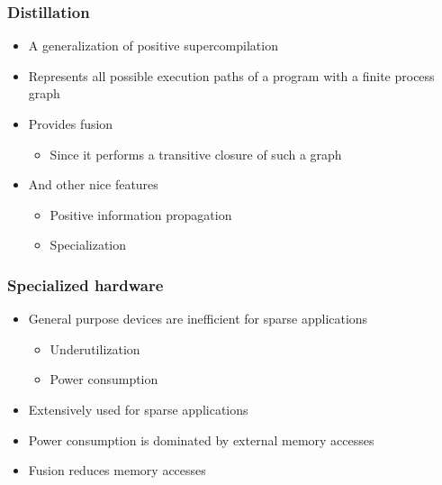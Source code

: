 \documentclass[xcolor=table]{beamer}
\begin{document}
\begin{frame}[fragile] \frametitle{Distillation}
    \begin{itemize}
        \item A generalization of positive supercompilation
        \vfill
        \item Represents all possible execution paths of a program with a finite process graph
        \vfill
        \item Provides \textcolor{forestgreen(web)}{fusion}
        \vfill
        \begin{itemize}
            \item Since it performs a transitive closure of such a graph
            \vfill
        \end{itemize}
        \item And other nice features
        \vfill
        \begin{itemize}
            \item Positive information propagation
            \vfill
            \item Specialization
        \end{itemize}
    \end{itemize}
  \end{frame}
  
  
\begin{frame}[fragile] \frametitle{Specialized hardware}
    \begin{itemize}
        \item General purpose devices are inefficient for sparse applications
        \vfill
        \begin{itemize}
            \item Underutilization
            \vfill
            \item Power consumption
            \vfill
        \end{itemize}
        \item Extensively used for sparse applications
        \vfill
        \item Power consumption is dominated by external memory accesses
        \vfill
        \item Fusion reduces memory accesses
    \end{itemize}
  \end{frame}  
\end{document}
